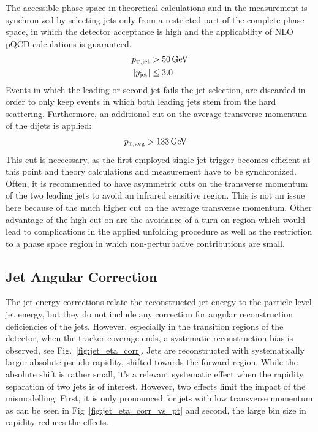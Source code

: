 The accessible phase space in theoretical calculations and in the measurement is
synchronized by selecting jets only from a restricted part of the complete phase
space, in which the detector acceptance is high and the applicability of NLO
pQCD calculations is guaranteed.
%
\begin{align*}
    \ptjet &> \SI{50}{\GeV}\\
    |y_\mathrm{jet}| &\leq 3.0\\
\end{align*}
%
Events in which the leading or second jet fails the jet selection, are
discarded in order to only keep events in which both leading jets stem
from the hard scattering. Furthermore, an additional cut on the
average transverse momentum of the dijets is applied:
%
\begin{align*}
    \ptavg &> \SI{133}{\GeV}
\end{align*}
%
This cut is neccessary, as the first employed single jet trigger becomes
efficient at this point and theory calculations and measurement have to be
synchronized.  Often, it is recommended to have asymmetric cuts on the
transverse momentum of the two leading jets to avoid an infrared sensitive
region. This is not an issue here because of the much higher cut on the average
transverse momentum. Other advantage of the high cut on \ptavg are the avoidance
of a turn-on region which would lead to complications in the applied unfolding
procedure as well as the restriction to a phase space region in which
non-perturbative contributions are small.

\subsection{Jet Angular Correction}

The jet energy corrections relate the reconstructed jet energy to the
particle level jet energy, but they do not include any correction for angular
reconstruction deficiencies of the jets. However, especially in the transition
regions of the detector, \ie when the tracker coverage ends, a systematic
reconstruction bias is observed, see Fig.~\ref{fig:jet_eta_corr}. Jets are
reconstructed with systematically larger absolute pseudo-rapidity, \ie shifted
towards the forward region. While the absolute shift is rather small, it's a
relevant systematic effect when the rapidity separation of two jets is of
interest. However, two effects limit the impact of the mismodelling. First, it
is only pronounced for jets with low transverse momentum as can be seen in
Fig~\ref{fig:jet_eta_corr_vs_pt} and second, the large bin size in rapidity
reduces the effects. 

